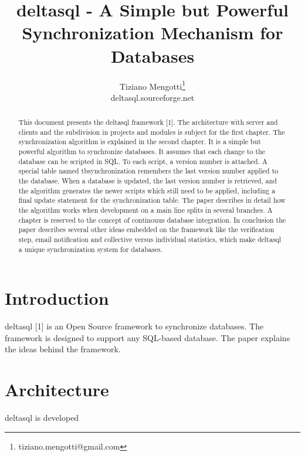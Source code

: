 \documentclass[10pt,a4paper]{article}
\begin{document}
\pagestyle{headings}

\title{deltasql - A Simple but Powerful Synchronization Mechanism for Databases}

\author{Tiziano Mengotti\thanks{tiziano.mengotti@gmail.com}\\
deltasql.sourceforge.net\\}

\maketitle
\thispagestyle{empty}

\begin{abstract}
This document presents the deltasql framework [1]. The architecture with server and clients and the subdivision in projects and modules is subject for the first chapter. 
The synchronization algorithm is explained in the second chapter. It is a simple but powerful algorithm to synchronize databases. It assumes that each change to the database can be scripted in SQL. To each script, a version number is attached. A special table named tbsynchronization remembers the last version number applied to the database. When a database is updated, the last version number is retrieved, and the algorithm generates the newer scripts which still need to be applied, including a final update statement for the synchronization table. The paper describes in detail how the algorithm works when development on a main line splits in several branches. 
A chapter is reserved to the concept of continouus database integration. In conclusion the paper describes several other ideas embedded on the framework like the verification step, email notification and collective versus individual statistics, which make deltasql a unique synchronization system for databases. 
\end{abstract}

\section{Introduction}
\label{sec:intro}
deltasql [1] is an Open Source framework to synchronize databases. The framework is designed to support any SQL-based database. The paper explains the ideas behind the framework.

\section{Architecture}

deltasql is developed 
\end{document}
